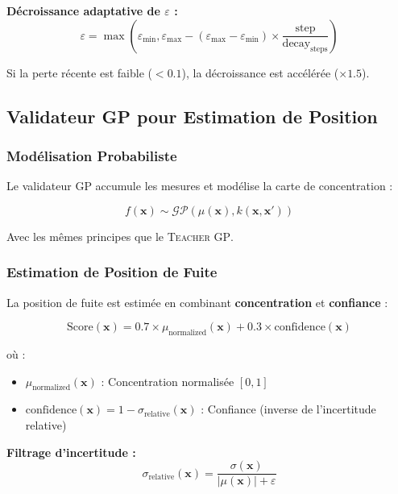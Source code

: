 \documentclass[12pt,a4paper]{article}
\newcommand{\teacher}{\textsc{Teacher}}
\newcommand{\gp}{\textsc{GP}}
\begin{document}
\textbf{Décroissance adaptative de $\varepsilon$ :}
\begin{equation}
\varepsilon = \max(\varepsilon_{\min}, \varepsilon_{\max} - (\varepsilon_{\max} - \varepsilon_{\min}) \times \frac{\text{step}}{\text{decay}_{\text{steps}}})
\end{equation}

Si la perte récente est faible ($< 0.1$), la décroissance est accélérée ($\times 1.5$).

\subsection{Validateur \gp{} pour Estimation de Position}

\subsubsection{Modélisation Probabiliste}

Le validateur \gp{} accumule les mesures et modélise la carte de concentration :

\begin{equation}
f(\mathbf{x}) \sim \mathcal{GP}(\mu(\mathbf{x}), k(\mathbf{x}, \mathbf{x}'))
\end{equation}

Avec les mêmes principes que le \teacher{} \gp{}.

\subsubsection{Estimation de Position de Fuite}

La position de fuite est estimée en combinant \textbf{concentration} et \textbf{confiance} :

\begin{equation}
\text{Score}(\mathbf{x}) = 0.7 \times \mu_{\text{normalized}}(\mathbf{x}) + 0.3 \times \text{confidence}(\mathbf{x})
\end{equation}

où :
\begin{itemize}
    \item $\mu_{\text{normalized}}(\mathbf{x})$ : Concentration normalisée $[0, 1]$
    \item $\text{confidence}(\mathbf{x}) = 1 - \sigma_{\text{relative}}(\mathbf{x})$ : Confiance (inverse de l'incertitude relative)
\end{itemize}

\textbf{Filtrage d'incertitude :}
\begin{equation}
\sigma_{\text{relative}}(\mathbf{x}) = \frac{\sigma(\mathbf{x})}{|\mu(\mathbf{x})| + \varepsilon}
\end{equation}
\end{document}
